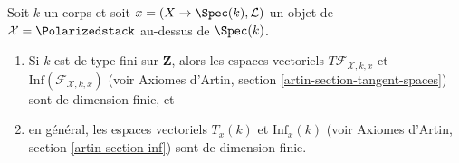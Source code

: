 \begin{lemma}
\label{lemma-polarized-tangent-space}
Soit $k$ un corps et soit $x = (X \to \Spec(k), \mathcal{L})$
un objet de $\mathcal{X} = \Polarizedstack$ au-dessus de $\Spec(k)$.
\begin{enumerate}
\item Si $k$ est de type fini sur $\mathbf{Z}$, alors les espaces vectoriels
$T\mathcal{F}_{\mathcal{X}, k, x}$ et
$\text{Inf}(\mathcal{F}_{\mathcal{X}, k, x})$
(voir Axiomes d'Artin, section \ref{artin-section-tangent-spaces})
sont de dimension finie, et
\item en général, les espaces vectoriels $T_x(k)$ et $\text{Inf}_x(k)$
(voir Axiomes d'Artin, section \ref{artin-section-inf})
sont de dimension finie.
\end{enumerate}
\end{lemma}

